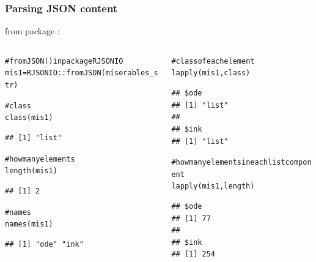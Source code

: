\documentclass{beamer}\usepackage[]{graphicx}\usepackage[]{color}
\makeatletter
\newcommand{\hlcom}[1]{\textcolor[rgb]{0.588,0.588,0.588}{#1}}%
\newcommand{\hlopt}[1]{\textcolor[rgb]{0.196,0.196,0.196}{#1}}%
\newcommand{\hlstd}[1]{\textcolor[rgb]{0.196,0.196,0.196}{#1}}%
\newcommand{\hlkwb}[1]{\textcolor[rgb]{0.627,0,0.314}{#1}}%
\newcommand{\hlkwd}[1]{\textcolor[rgb]{0.78,0.227,0.412}{#1}}%
\newenvironment{kframe}{%
 \def\at@end@of@kframe{}%
 \ifinner\ifhmode%
  \def\at@end@of@kframe{\end{minipage}}%
  \begin{minipage}{\columnwidth}%
 \fi\fi%
 \def\FrameCommand##1{\hskip\@totalleftmargin \hskip-\fboxsep
 \colorbox{shadecolor}{##1}\hskip-\fboxsep
     \hskip-\linewidth \hskip-\@totalleftmargin \hskip\columnwidth}%
 \MakeFramed {\advance\hsize-\width
   \@totalleftmargin\z@ \linewidth\hsize
   \@setminipage}}%
 {\par\unskip\endMakeFramed%
 \at@end@of@kframe}
\newenvironment{knitrout}{}{} %
\makeatother
\begin{document}
\begin{frame}[fragile]
\frametitle{Parsing JSON content}

 from package :

\begin{columns}[t]
\begin{column}{0.5\textwidth}
\begin{knitrout}\tiny
{}\color{fgcolor}\begin{kframe}
\begin{alltt}
\hlcom{# fromJSON() in package RJSONIO}
\hlstd{mis1} \hlkwb{=} \hlstd{RJSONIO}\hlopt{::}\hlkwd{fromJSON}\hlstd{(miserables_str)}

\hlcom{# class}
\hlkwd{class}\hlstd{(mis1)}
\end{alltt}
\begin{verbatim}
## [1] "list"
\end{verbatim}
\begin{alltt}
\hlcom{# how many elements}
\hlkwd{length}\hlstd{(mis1)}
\end{alltt}
\begin{verbatim}
## [1] 2
\end{verbatim}
\begin{alltt}
\hlcom{# names}
\hlkwd{names}\hlstd{(mis1)}
\end{alltt}
\begin{verbatim}
## [1] "ode" "ink"
\end{verbatim}
\end{kframe}
\end{knitrout}
\end{column}

\begin{column}{0.5\textwidth}
\begin{knitrout}\tiny
{}\color{fgcolor}\begin{kframe}
\begin{alltt}
\hlcom{# class of each element}
\hlkwd{lapply}\hlstd{(mis1, class)}
\end{alltt}
\begin{verbatim}
## $ode
## [1] "list"
## 
## $ink
## [1] "list"
\end{verbatim}
\begin{alltt}
\hlcom{# how many elements in each list component}
\hlkwd{lapply}\hlstd{(mis1, length)}
\end{alltt}
\begin{verbatim}
## $ode
## [1] 77
## 
## $ink
## [1] 254
\end{verbatim}
\end{kframe}
\end{knitrout}
\end{column}
\end{columns}

\end{frame}
\end{document}
